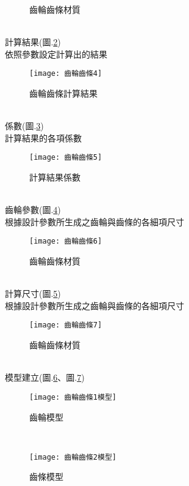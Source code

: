 \begin{itemize}
\begin{figure}[hbt!]
\begin{center}
		\caption{\Large 齒輪齒條材質}\label{2.40}
		\end{center}
		\end{figure}
		\\
		計算結果(圖.\ref{2.41}) \\
		\qquad 依照參數設定計算出的結果\\
		\begin{figure}[hbt!]
		\begin{center}
		\texttt{[image: 齒輪齒條4]}
		\caption{\Large 齒輪齒條計算結果}\label{2.41}
		\end{center}
		\end{figure}
		\\
		係數(圖.\ref{2.42}) \\
		\qquad 計算結果的各項係數\\
		\begin{figure}[hbt!]
		\begin{center}
		\texttt{[image: 齒輪齒條5]}
		\caption{\Large 計算結果係數}\label{2.42}
		\end{center}
		\end{figure}
		\\
		齒輪參數(圖.\ref{2.43}) \\
		\qquad 根據設計參數所生成之齒輪與齒條的各細項尺寸\\
		\begin{figure}[hbt!]
		\begin{center}
		\texttt{[image: 齒輪齒條6]}
		\caption{\Large 齒輪齒條材質}\label{2.43}
		\end{center}
		\end{figure}
		\\
		計算尺寸(圖.\ref{2.431}) \\
		\qquad 根據設計參數所生成之齒輪與齒條的各細項尺寸\\
		\begin{figure}[hbt!]
		\begin{center}
		\texttt{[image: 齒輪齒條7]}
		\caption{\Large 齒輪齒條材質}\label{2.431}
		\end{center}
		\end{figure}
		\\
		模型建立(圖.\ref{2.44}、圖.\ref{2.45}) \\
		\begin{figure}[hbt!]
		\begin{center}
		\texttt{[image: 齒輪齒條1模型]}
		\caption{\Large 齒輪模型}\label{2.44}
		\end{center}
		\end{figure}
		\\
		\begin{figure}[hbt!]
		\begin{center}
		\texttt{[image: 齒輪齒條2模型]}
		\caption{\Large 齒條模型}\label{2.45}
		\end{center}
		\end{figure}
		\\
		

\end{itemize}
